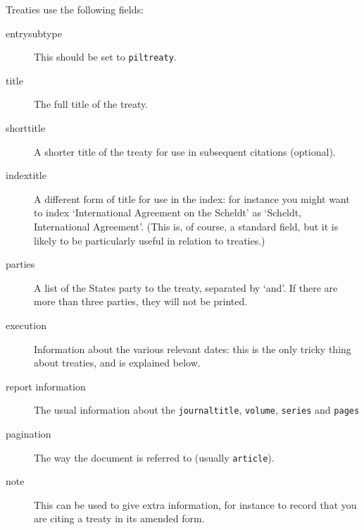\documentclass[a4paper,
               11pt,
	       DIV=1,			   
	       footinclude=false]
	      {scrartcl}
\begin{document}
Treaties use the following fields:
\begin{description}
\item[entrysubtype]
This should be set to \texttt{piltreaty}.
\item[title] 
The full title of the treaty.
\item[shorttitle] 
A shorter title of the treaty for use in subsequent
  citations (optional).
\item[indextitle]
  A different form of title for use in the index: for
  instance you might want to index `International Agreement on the
  Scheldt' as `Scheldt, International Agreement'. (This is, of course, a standard field, but it is likely to be particularly useful in relation to treaties.)
\item[parties]
  A list of the States party to the treaty, separated by
  `and'. If there are more than three parties, they will not be
  printed.
\item[execution]
  Information about the various relevant dates: this is
  the only tricky thing about treaties, and is explained below.
\item[\textrm{report information}] The usual information about the
  \texttt{journaltitle}, \texttt{volume}, \texttt{series} and
  \texttt{pages}
\item[pagination] The way the document is referred to (usually
  \texttt{article}).
\item[note]
  This can be used to give extra information, for instance
  to record that you are citing a treaty in its amended form.
\end{description}
\end{document}
